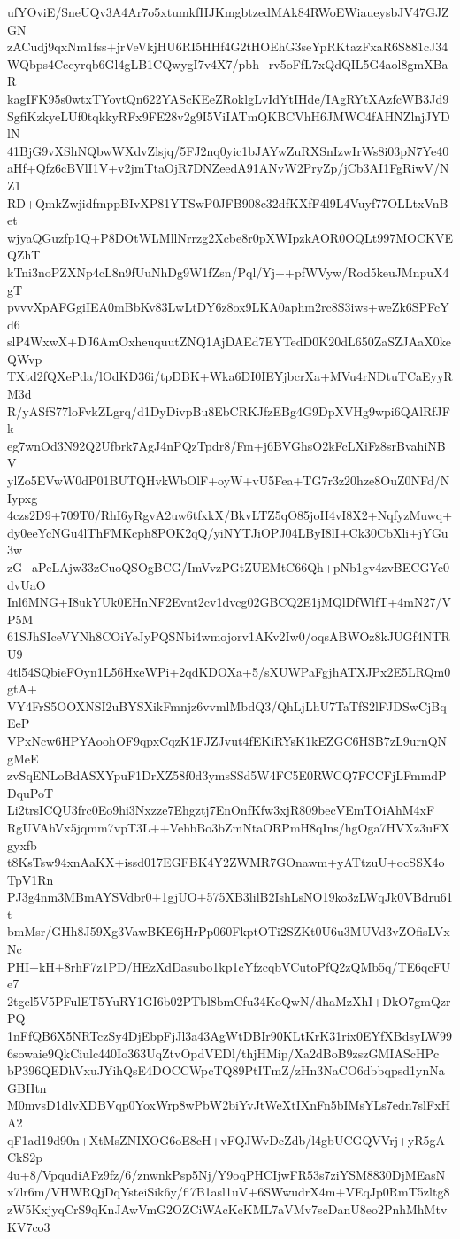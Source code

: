 ufYOviE/SneUQv3A4Ar7o5xtumkfHJKmgbtzedMAk84RWoEWiaueysbJV47GJZGN
zACudj9qxNm1fss+jrVeVkjHU6RI5HHf4G2tHOEhG3seYpRKtazFxaR6S881cJ34
WQbps4Cccyrqb6Gl4gLB1CQwygI7v4X7/pbh+rv5oFfL7xQdQIL5G4aol8gmXBaR
kagIFK95s0wtxTYovtQn622YAScKEeZRoklgLvIdYtIHde/IAgRYtXAzfcWB3Jd9
SgfiKzkyeLUf0tqkkyRFx9FE28v2g9I5ViIATmQKBCVhH6JMWC4fAHNZlnjJYDlN
41BjG9vXShNQbwWXdvZlsjq/5FJ2nq0yic1bJAYwZuRXSnIzwIrWs8i03pN7Ye40
aHf+Qfz6cBVlI1V+v2jmTtaOjR7DNZeedA91ANvW2PryZp/jCb3AI1FgRiwV/NZ1
RD+QmkZwjidfmppBIvXP81YTSwP0JFB908c32dfKXfF4l9L4Vuyf77OLLtxVnBet
wjyaQGuzfp1Q+P8DOtWLMllNrrzg2Xcbe8r0pXWIpzkAOR0OQLt997MOCKVEQZhT
kTni3noPZXNp4cL8n9fUuNhDg9W1fZsn/Pql/Yj++pfWVyw/Rod5keuJMnpuX4gT
pvvvXpAFGgiIEA0mBbKv83LwLtDY6z8ox9LKA0aphm2rc8S3iws+weZk6SPFcYd6
slP4WxwX+DJ6AmOxheuquutZNQ1AjDAEd7EYTedD0K20dL650ZaSZJAaX0keQWvp
TXtd2fQXePda/lOdKD36i/tpDBK+Wka6DI0IEYjbcrXa+MVu4rNDtuTCaEyyRM3d
R/yASfS77loFvkZLgrq/d1DyDivpBu8EbCRKJfzEBg4G9DpXVHg9wpi6QAlRfJFk
eg7wnOd3N92Q2Ufbrk7AgJ4nPQzTpdr8/Fm+j6BVGhsO2kFcLXiFz8srBvahiNBV
ylZo5EVwW0dP01BUTQHvkWbOlF+oyW+vU5Fea+TG7r3z20hze8OuZ0NFd/NIypxg
4czs2D9+709T0/RhI6yRgvA2uw6tfxkX/BkvLTZ5qO85joH4vI8X2+NqfyzMuwq+
dy0eeYcNGu4lThFMKcph8POK2qQ/yiNYTJiOPJ04LByI8lI+Ck30CbXli+jYGu3w
zG+aPeLAjw33zCuoQSOgBCG/ImVvzPGtZUEMtC66Qh+pNb1gv4zvBECGYc0dvUaO
Inl6MNG+I8ukYUk0EHnNF2Evnt2cv1dvcg02GBCQ2E1jMQlDfWlfT+4mN27/VP5M
61SJhSIceVYNh8COiYeJyPQSNbi4wmojorv1AKv2Iw0/oqsABWOz8kJUGf4NTRU9
4tl54SQbieFOyn1L56HxeWPi+2qdKDOXa+5/sXUWPaFgjhATXJPx2E5LRQm0gtA+
VY4FrS5OOXNSI2uBYSXikFmnjz6vvmlMbdQ3/QhLjLhU7TaTfS2lFJDSwCjBqEeP
VPxNcw6HPYAoohOF9qpxCqzK1FJZJvut4fEKiRYsK1kEZGC6HSB7zL9urnQNgMeE
zvSqENLoBdASXYpuF1DrXZ58f0d3ymsSSd5W4FC5E0RWCQ7FCCFjLFmmdPDquPoT
Li2trsICQU3frc0Eo9hi3Nxzze7Ehgztj7EnOnfKfw3xjR809becVEmTOiAhM4xF
RgUVAhVx5jqmm7vpT3L++VehbBo3bZmNtaORPmH8qIns/hgOga7HVXz3uFXgyxfb
t8KsTsw94xnAaKX+issd017EGFBK4Y2ZWMR7GOnawm+yATtzuU+ocSSX4oTpV1Rn
PJ3g4nm3MBmAYSVdbr0+1gjUO+575XB3lilB2IshLsNO19ko3zLWqJk0VBdru61t
bmMsr/GHh8J59Xg3VawBKE6jHrPp060FkptOTi2SZKt0U6u3MUVd3vZOfisLVxNc
PHI+kH+8rhF7z1PD/HEzXdDasubo1kp1cYfzcqbVCutoPfQ2zQMb5q/TE6qcFUe7
2tgcl5V5PFulET5YuRY1GI6b02PTbl8bmCfu34KoQwN/dhaMzXhI+DkO7gmQzrPQ
1nFfQB6X5NRTczSy4DjEbpFjJl3a43AgWtDBIr90KLtKrK31rix0EYfXBdsyLW99
6sowaie9QkCiulc440Io363UqZtvOpdVEDl/thjHMip/Xa2dBoB9zszGMIAScHPc
bP396QEDhVxuJYihQsE4DOCCWpcTQ89PtITmZ/zHn3NaCO6dbbqpsd1ynNaGBHtn
M0mvsD1dlvXDBVqp0YoxWrp8wPbW2biYvJtWeXtIXnFn5bIMsYLs7edn7slFxHA2
qF1ad19d90n+XtMsZNIXOG6oE8cH+vFQJWvDcZdb/l4gbUCGQVVrj+yR5gACkS2p
4u+8/VpqudiAFz9fz/6/znwnkPsp5Nj/Y9oqPHCIjwFR53s7ziYSM8830DjMEasN
x7lr6m/VHWRQjDqYsteiSik6y/fl7B1asl1uV+6SWwudrX4m+VEqJp0RmT5zltg8
zW5KxjyqCrS9qKnJAwVmG2OZCiWAcKcKML7aVMv7scDanU8eo2PnhMhMtvKV7co3
